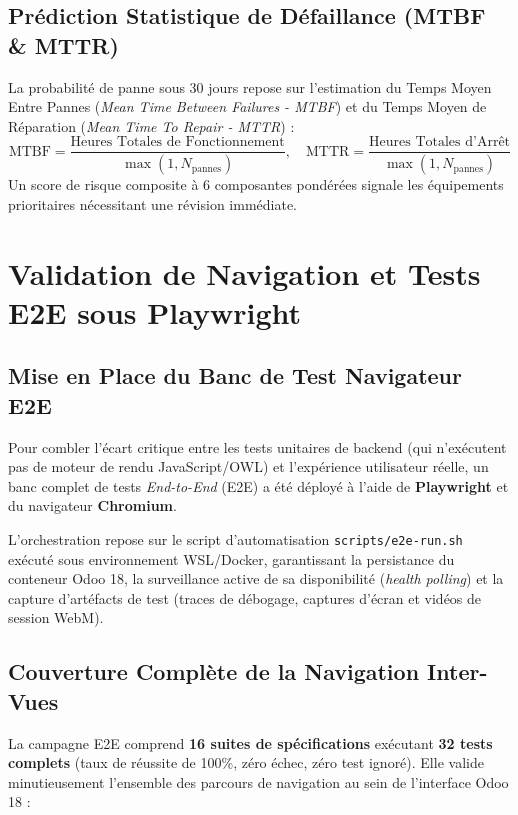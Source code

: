 \subsection{Prédiction Statistique de Défaillance (MTBF \& MTTR)}
La probabilité de panne sous 30 jours repose sur l'estimation du Temps Moyen Entre Pannes (\textit{Mean Time Between Failures - MTBF}) et du Temps Moyen de Réparation (\textit{Mean Time To Repair - MTTR}) :
\begin{equation}
\text{MTBF} = \frac{\text{Heures Totales de Fonctionnement}}{\max(1, N_{\text{pannes}})}, \quad \text{MTTR} = \frac{\text{Heures Totales d'Arrêt}}{\max(1, N_{\text{pannes}})}
\end{equation}
Un score de risque composite à 6 composantes pondérées signale les équipements prioritaires nécessitant une révision immédiate.

\section{Validation de Navigation et Tests E2E sous Playwright}

\subsection{Mise en Place du Banc de Test Navigateur E2E}
Pour combler l'écart critique entre les tests unitaires de backend (qui n'exécutent pas de moteur de rendu JavaScript/OWL) et l'expérience utilisateur réelle, un banc complet de tests \textit{End-to-End} (E2E) a été déployé à l'aide de \textbf{Playwright} et du navigateur \textbf{Chromium}.

L'orchestration repose sur le script d'automatisation \texttt{scripts/e2e-run.sh} exécuté sous environnement WSL/Docker, garantissant la persistance du conteneur Odoo 18, la surveillance active de sa disponibilité (\textit{health polling}) et la capture d'artéfacts de test (traces de débogage, captures d'écran et vidéos de session WebM).

\subsection{Couverture Complète de la Navigation Inter-Vues}
La campagne E2E comprend \textbf{16 suites de spécifications} exécutant \textbf{32 tests complets} (taux de réussite de 100\%, zéro échec, zéro test ignoré). Elle valide minutieusement l'ensemble des parcours de navigation au sein de l'interface Odoo 18 :

